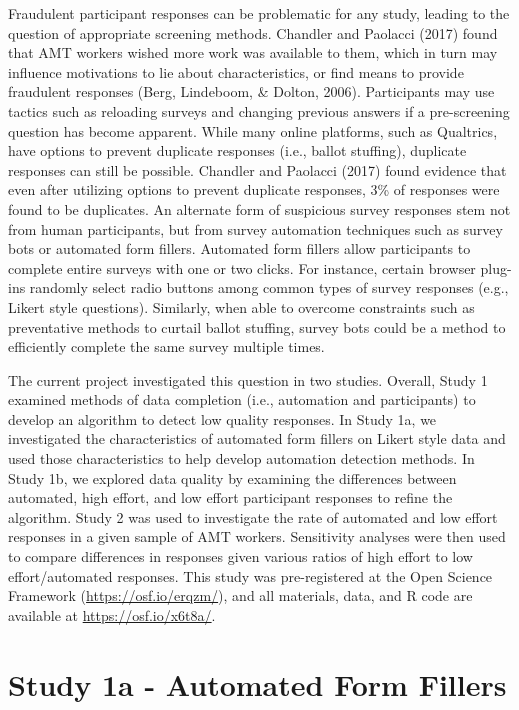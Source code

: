 \documentclass[english,man]{apa6}
\theoremstyle{definition}
\theoremstyle{definition}
\theoremstyle{definition}
\theoremstyle{remark}
\begin{document}
Fraudulent participant responses can be problematic for any study,
leading to the question of appropriate screening methods. Chandler and
Paolacci (2017) found that AMT workers wished more work was available to
them, which in turn may influence motivations to lie about
characteristics, or find means to provide fraudulent responses (Berg,
Lindeboom, \& Dolton, 2006). Participants may use tactics such as
reloading surveys and changing previous answers if a pre-screening
question has become apparent. While many online platforms, such as
Qualtrics, have options to prevent duplicate responses (i.e., ballot
stuffing), duplicate responses can still be possible. Chandler and
Paolacci (2017) found evidence that even after utilizing options to
prevent duplicate responses, 3\% of responses were found to be
duplicates. An alternate form of suspicious survey responses stem not
from human participants, but from survey automation techniques such as
survey bots or automated form fillers. Automated form fillers allow
participants to complete entire surveys with one or two clicks. For
instance, certain browser plug-ins randomly select radio buttons among
common types of survey responses (e.g., Likert style questions).
Similarly, when able to overcome constraints such as preventative
methods to curtail ballot stuffing, survey bots could be a method to
efficiently complete the same survey multiple times.

The current project investigated this question in two studies. Overall,
Study 1 examined methods of data completion (i.e., automation and
participants) to develop an algorithm to detect low quality responses.
In Study 1a, we investigated the characteristics of automated form
fillers on Likert style data and used those characteristics to help
develop automation detection methods. In Study 1b, we explored data
quality by examining the differences between automated, high effort, and
low effort participant responses to refine the algorithm. Study 2 was
used to investigate the rate of automated and low effort responses in a
given sample of AMT workers. Sensitivity analyses were then used to
compare differences in responses given various ratios of high effort to
low effort/automated responses. This study was pre-registered at the
Open Science Framework (\url{https://osf.io/erqzm/}), and all materials,
data, and R code are available at \url{https://osf.io/x6t8a/}.

\section{Study 1a - Automated Form
Fillers}\label{study-1a---automated-form-fillers}
\end{document}
